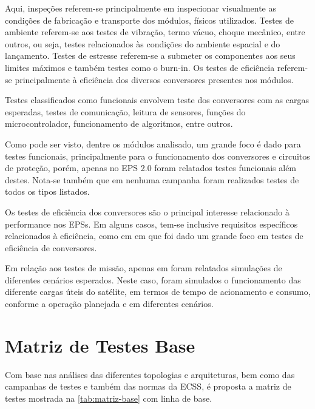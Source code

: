 Aqui, inspeções referem-se principalmente em inspecionar visualmente as condições de fabricação e transporte dos módulos, físicos utilizados.
Testes de ambiente referem-se aos testes de vibração, termo vácuo, choque mecânico, entre outros, ou seja, testes relacionados às condições do ambiente espacial e do lançamento.
Testes de estresse referem-se a submeter os componentes aos seus limites máximos e também testes como o burn-in.
Os testes de eficiência referem-se principalmente à eficiência dos diversos conversores presentes nos módulos.

Testes classificados como funcionais envolvem teste dos conversores com as cargas esperadas, testes de comunicação, leitura de sensores, funções do microcontrolador, funcionamento de algoritmos, entre outros.

Como pode ser visto, dentre os módulos analisado, um grande foco é dado para testes funcionais, principalmente para o funcionamento dos conversores e circuitos de proteção, porém, apenas no EPS 2.0 foram relatados testes funcionais além destes.
Nota-se também que em nenhuma campanha foram realizados testes de todos os tipos listados.

Os testes de eficiência dos conversores são o principal interesse relacionado à performance nos \gls{EPS}s.
Em alguns casos, tem-se inclusive requisitos específicos relacionados à eficiência, como em \textcite{aalto-eps} em que foi dado um grande foco em testes de eficiência de conversores.

Em relação aos testes de missão, apenas em \textcite{mist-eps} foram relatados simulações de diferentes cenários esperados.
Neste caso, foram simulados o funcionamento das diferente cargas úteis do satélite, em termos de tempo de acionamento e consumo, conforme a operação planejada e em diferentes cenários.


\section{Matriz de Testes Base} \label{sec:matriz-base}


Com base nas análises das diferentes topologias e arquiteturas, bem como das campanhas de testes e também das normas da \gls{ECSS}, é proposta a matriz de testes mostrada na \autoref{tab:matriz-base} com linha de base.


